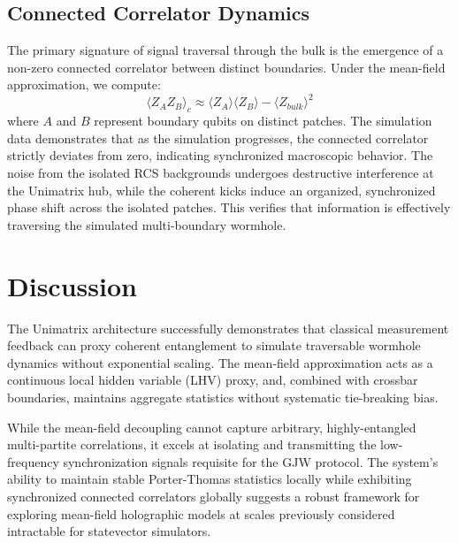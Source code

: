 \documentclass[11pt,a4paper]{article}
\begin{document}
\subsection{Connected Correlator Dynamics}
The primary signature of signal traversal through the bulk is the emergence of a non-zero connected correlator between distinct boundaries. Under the mean-field approximation, we compute:
\begin{equation}
    \langle Z_A Z_B \rangle_c \approx \langle Z_A \rangle \langle Z_B \rangle - \langle Z_{bulk} \rangle^2
\end{equation}
where $A$ and $B$ represent boundary qubits on distinct patches. The simulation data demonstrates that as the simulation progresses, the connected correlator strictly deviates from zero, indicating synchronized macroscopic behavior. The noise from the isolated RCS backgrounds undergoes destructive interference at the Unimatrix hub, while the coherent kicks induce an organized, synchronized phase shift across the isolated patches. This verifies that information is effectively traversing the simulated multi-boundary wormhole.

\section{Discussion}
The Unimatrix architecture successfully demonstrates that classical measurement feedback can proxy coherent entanglement to simulate traversable wormhole dynamics without exponential scaling. The mean-field approximation acts as a continuous local hidden variable (LHV) proxy, and, combined with crossbar boundaries, maintains aggregate statistics without systematic tie-breaking bias.

While the mean-field decoupling cannot capture arbitrary, highly-entangled multi-partite correlations, it excels at isolating and transmitting the low-frequency synchronization signals requisite for the GJW protocol. The system's ability to maintain stable Porter-Thomas statistics locally while exhibiting synchronized connected correlators globally suggests a robust framework for exploring mean-field holographic models at scales previously considered intractable for statevector simulators.
\end{document}
